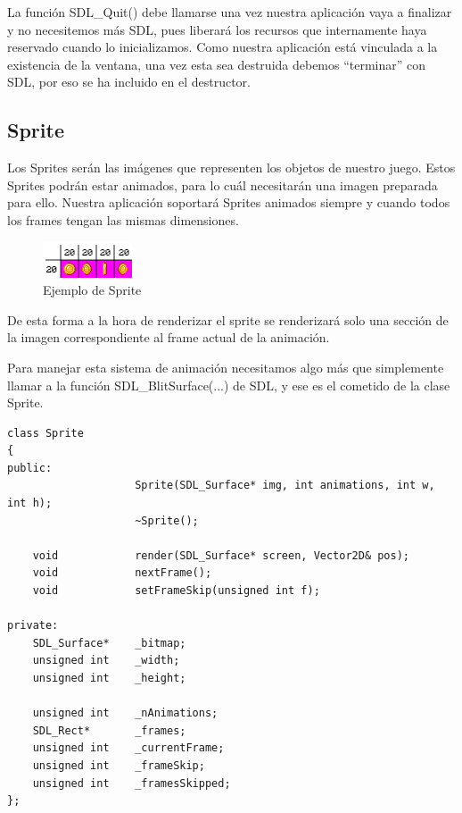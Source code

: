\documentclass[parskip=half*]{scrartcl}
\begin{document}
				La funci\'on SDL\_Quit() debe llamarse una vez nuestra aplicaci\'on vaya a finalizar y no necesitemos m\'as SDL, pues liberar\'a los recursos que internamente haya reservado cuando lo inicializamos. Como nuestra aplicaci\'on est\'a vinculada a la existencia de la ventana, una vez esta sea destruida debemos ``terminar'' con SDL, por eso se ha incluido en el destructor.

	\subsection{Sprite}
		Los Sprites ser\'an las im\'agenes que representen los objetos de nuestro juego. Estos Sprites podr\'an estar animados, para lo cu\'al necesitar\'an una imagen preparada para ello. Nuestra aplicaci\'on soportar\'a Sprites animados siempre y cuando todos los frames tengan las mismas dimensiones.

		\begin{figure}[h]
			\centering
			\includegraphics{MulticocoSDL/img/sprite_example.png}
			\caption{Ejemplo de Sprite}
		\end{figure}

		De esta forma a la hora de renderizar el sprite se renderizar\'a solo una secci\'on de la imagen correspondiente al frame actual de la animaci\'on.

		Para manejar esta sistema de animaci\'on necesitamos algo m\'as que simplemente llamar a la funci\'on SDL\_BlitSurface(...) de SDL, y ese es el cometido de la clase Sprite.

		\begin{verbatim}
class Sprite
{
public:
                    Sprite(SDL_Surface* img, int animations, int w, int h);
                    ~Sprite();
    
    void            render(SDL_Surface* screen, Vector2D& pos);
    void            nextFrame();
    void            setFrameSkip(unsigned int f);
    
private:
    SDL_Surface*    _bitmap;
    unsigned int    _width;
    unsigned int    _height;

    unsigned int    _nAnimations;
    SDL_Rect*       _frames;
    unsigned int    _currentFrame;    
    unsigned int    _frameSkip;
    unsigned int    _framesSkipped;
};
		\end{verbatim}
\end{document}

